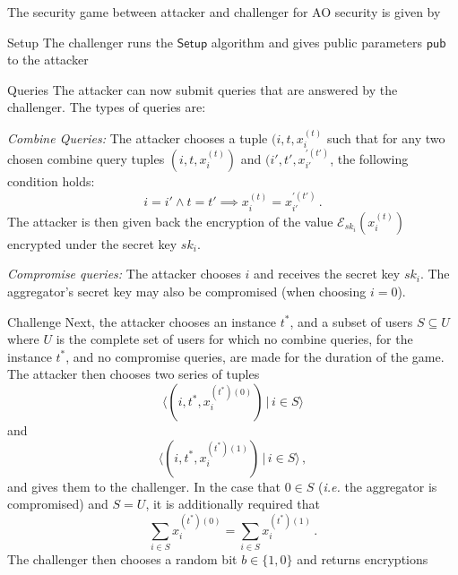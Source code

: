\documentclass[10pt,journal,compsoc]{IEEEtran}
\theoremstyle{definition}
\theoremstyle{definition}
\theoremstyle{remark}
\begin{document}
The security game between attacker and challenger for AO security is given by
\begin{LaTeXdescription}
    \item[Setup] The challenger runs the $\mathsf{Setup}$ algorithm and gives public parameters $\mathsf{pub}$ to the attacker
    \item[Queries] The attacker can now submit queries that are answered by the challenger. The types of queries are:
    \begin{LaTeXenumerate}
        \item \textit{Combine Queries:} The attacker chooses a tuple $(i,t,x^{(t)}_i$ such that for any two chosen combine query tuples $(i,t,x^{(t)}_i)$ and $(i',t',x^{\prime(t')}_{i'}$, the following condition holds:
        \begin{equation*}
            i = i' \wedge t = t' \implies x^{(t)}_{i} = x^{\prime(t')}_{i'}\,.
        \end{equation*}
        The attacker is then given back the encryption of the value $\mathcal{E}_{sk_i}(x^{(t)}_i)$ encrypted under the secret key $sk_i$.
        \item \textit{Compromise queries:} The attacker chooses $i$ and receives the secret key $sk_i$. The aggregator's secret key may also be compromised (when choosing $i=0$).
    \end{LaTeXenumerate} 
    \item[Challenge] Next, the attacker chooses an instance $t^*$, and a subset of users $S \subseteq U$ where $U$ is the complete set of users for which no combine queries, for the instance $t^*$, and no compromise queries, are made for the duration of the game. The attacker then chooses two series of tuples
    \begin{equation*}
        \langle(i,t^*,x^{(t^*)(0)}_i)\,|\,i \in S\rangle
    \end{equation*}
    and
    \begin{equation*}
        \langle(i,t^*,x^{(t^*)(1)}_i)\,|\, i \in S\rangle\,,
    \end{equation*}
    and gives them to the challenger. In the case that $0 \in S$ (\textit{i.e.} the aggregator is compromised) and $S = U$, it is additionally required that
    \begin{equation*}
        \sum_{i\in S} x^{(t^*)(0)}_i = \sum_{i \in S} x^{(t^*)(1)}_i\,.
    \end{equation*}
    The challenger then chooses a random bit $b \in \{1,0\}$ and returns encryptions 
    \begin{equation*}

\end{equation*}
\end{LaTeXdescription}
\end{document}
